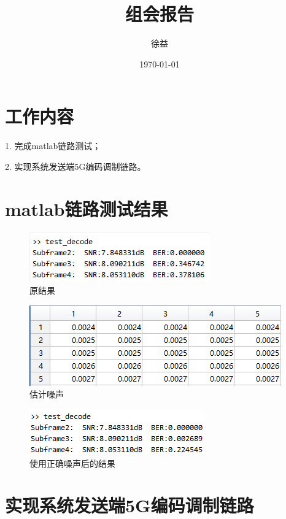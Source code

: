 \documentclass{article}
\title{组会报告}
\author{徐益}
\date{\today}
\begin{document}
\maketitle


\section{工作内容} 
1. 完成matlab链路测试；

2. 实现系统发送端5G编码调制链路。

\section{matlab链路测试结果}
\begin{figure}[H]
	\centering
	\includegraphics[width = .6\textwidth]{oldrst.png}
	\caption{原结果}
\end{figure}
\begin{figure}[H]
	\centering
	\includegraphics[width = .8\textwidth]{estn.png}
	\caption{估计噪声}
\end{figure}
\begin{figure}[H]
	\centering
	\includegraphics[width = .6\textwidth]{newrst.png}
	\caption{使用正确噪声后的结果}
\end{figure}

\section{实现系统发送端5G编码调制链路}
\end{document}
